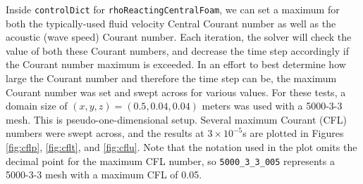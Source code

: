 Inside \verb|controlDict| for \verb|rhoReactingCentralFoam|, we can set a maximum for both the typically-used fluid velocity Central Courant number as well as the acoustic (wave speed) Courant number. Each iteration, the solver will check the value of both these Courant numbers, and decrease the time step accordingly if the Courant number maximum is exceeded. In an effort to best determine how large the Courant number and therefore the time step can be, the maximum Courant number was set and swept across for various values. For these tests, a domain size of \( (x,y,z) = (0.5,0.04,0.04) \) meters was used with a 5000-3-3 mesh. This is pseudo-one-dimensional setup. Several maximum Courant (CFL) numbers were swept across, and the results at \(3\times 10^{ - 5}\)s are plotted in Figures \ref{fig:cflp}, \ref{fig:cflt}, and \ref{fig:cflu}. Note that the notation used in the plot omits the decimal point for the maximum CFL number, so \verb|5000_3_3_005| represents a 5000-3-3 mesh with a maximum CFL of 0.05. 

